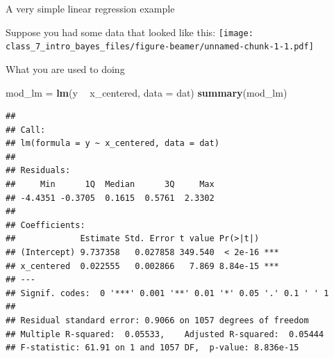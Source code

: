 \documentclass[ignorenonframetext,]{beamer}
\newenvironment{Shaded}{\begin{snugshade}}{\end{snugshade}}
\newcommand{\KeywordTok}[1]{\textcolor[rgb]{0.13,0.29,0.53}{\textbf{#1}}}
\newcommand{\DataTypeTok}[1]{\textcolor[rgb]{0.13,0.29,0.53}{#1}}
\newcommand{\StringTok}[1]{\textcolor[rgb]{0.31,0.60,0.02}{#1}}
\newcommand{\OperatorTok}[1]{\textcolor[rgb]{0.81,0.36,0.00}{\textbf{#1}}}
\newcommand{\NormalTok}[1]{#1}
\begin{document}
\begin{frame}{A very simple linear regression example}

Suppose you had some data that looked like this:
\texttt{[image: class\_7\_intro\_bayes\_files/figure-beamer/unnamed-chunk-1-1.pdf]}

\end{frame}

\begin{frame}[fragile]{What you are used to doing}

\tiny

\begin{Shaded}
\begin{Highlighting}[]
\NormalTok{mod_lm =}\StringTok{ }\KeywordTok{lm}\NormalTok{(y }\OperatorTok{~}\StringTok{ }\NormalTok{x_centered, }\DataTypeTok{data =}\NormalTok{ dat)}
\KeywordTok{summary}\NormalTok{(mod_lm)}
\end{Highlighting}
\end{Shaded}

\begin{verbatim}
## 
## Call:
## lm(formula = y ~ x_centered, data = dat)
## 
## Residuals:
##     Min      1Q  Median      3Q     Max 
## -4.4351 -0.3705  0.1615  0.5761  2.3302 
## 
## Coefficients:
##             Estimate Std. Error t value Pr(>|t|)    
## (Intercept) 9.737358   0.027858 349.540  < 2e-16 ***
## x_centered  0.022555   0.002866   7.869 8.84e-15 ***
## ---
## Signif. codes:  0 '***' 0.001 '**' 0.01 '*' 0.05 '.' 0.1 ' ' 1
## 
## Residual standard error: 0.9066 on 1057 degrees of freedom
## Multiple R-squared:  0.05533,    Adjusted R-squared:  0.05444 
## F-statistic: 61.91 on 1 and 1057 DF,  p-value: 8.836e-15
\end{verbatim}

\normalsize

\end{frame}
\end{document}
